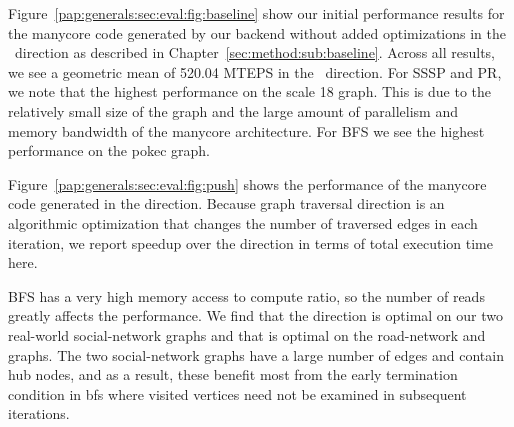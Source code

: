 Figure~\ref{pap:generals:sec:eval:fig:baseline} show our initial performance results for the manycore code generated by our backend without added optimizations in the \pull~direction as described in Chapter~\ref{sec:method:sub:baseline}.
Across all results, we see a geometric mean of 520.04 MTEPS in the \pull~direction.%
For SSSP and PR, we note that the highest performance on the \kron scale 18 graph.
This is due to the relatively small size of the graph and the large amount of parallelism and memory bandwidth of the manycore architecture.
For BFS we see the highest performance on the pokec graph.
 
Figure~\ref{pap:generals:sec:eval:fig:push} shows the performance of the manycore code generated in the \push direction.
Because graph traversal direction is an algorithmic optimization that changes the number of traversed edges in each iteration, we report speedup over the \pull direction in terms of total execution time here.

BFS has a very high memory access to compute ratio, so the number of reads greatly affects the performance.
We find that the \pull direction is optimal on our two real-world social-network graphs and that \push is optimal on the road-network and \kron graphs.
The two social-network graphs have a large number of edges and contain hub nodes, and as a result, these benefit most from the early termination condition in bfs \pull where visited vertices need not be examined in subsequent iterations.
 
